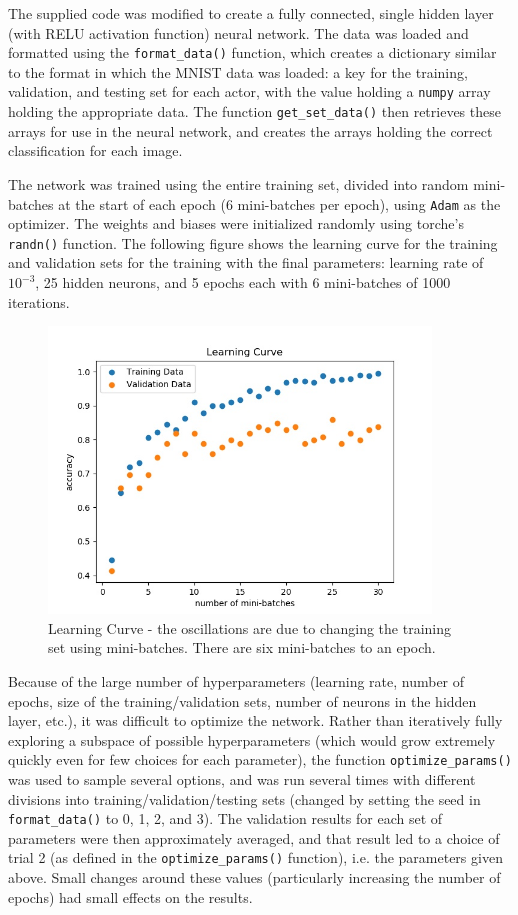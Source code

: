 \documentclass{article}
\begin{document}
   The supplied code was modified to create a fully connected, single hidden layer (with RELU
   activation function) neural network. The data was loaded and formatted using the \texttt{format\_data()}
   function, which creates a dictionary similar to the format in which the MNIST data was loaded:
   a key for the training, validation, and testing set for each actor, with the value holding a
   \texttt{numpy} array holding the appropriate data.
   The function \texttt{get\_set\_data()} then retrieves these arrays for use in the neural network,
   and creates the arrays holding the correct classification for each image.

   The network was trained using the entire training set, divided into random mini-batches at the
   start of each epoch (6 mini-batches per epoch), using \texttt{Adam} as the optimizer.
   The weights and biases were initialized randomly using torche's \texttt{randn()} function.
   The following figure shows the learning curve for the training and validation sets for the training
   with the final parameters: learning rate of $10^{-3}$, 25 hidden neurons, and 5 epochs each with 6 mini-batches
   of 1000 iterations.
      \begin{figure}[h] \centering
         \includegraphics[width=4in]{resources/part8}
         \caption{Learning Curve - the oscillations are due to changing the training set
                  using mini-batches. There are six mini-batches to an epoch.}
       \end{figure}

   Because of the large number of hyperparameters (learning rate, number of epochs, size of the
   training/validation sets, number of neurons in the hidden layer, etc.), it was difficult to
   optimize the network.
   Rather than iteratively fully exploring a subspace of possible hyperparameters (which would grow
   extremely quickly even for few choices for each parameter), the function \texttt{optimize\_params()}
   was used to sample several options, and was run several times with different divisions into
   training/validation/testing sets (changed by setting the seed in \texttt{format\_data()} to 0, 1, 2, and 3).
   The validation results for each set of parameters were then approximately averaged, and that result
   led to a choice of trial 2 (as defined in the \texttt{optimize\_params()} function), i.e. the parameters
   given above. Small changes around these values (particularly increasing the number of epochs)
   had small effects on the results.
\end{document}
